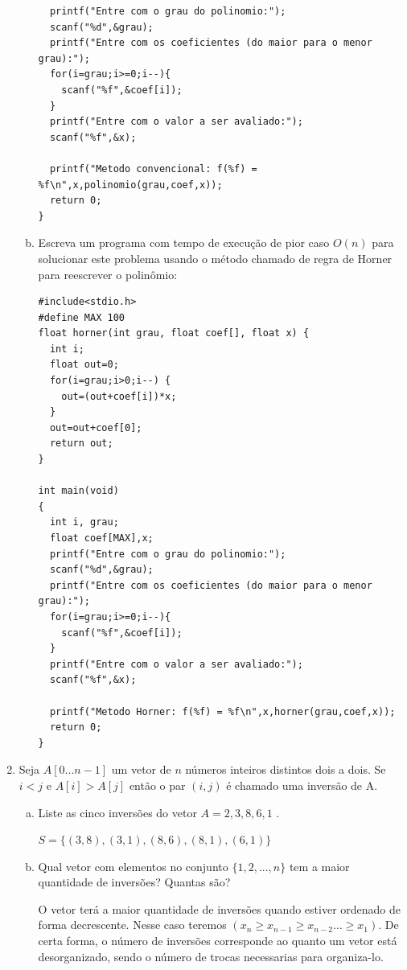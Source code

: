 \documentclass[a4paper,10pt]{article}
\begin{document}
\begin{enumerate}
\begin{enumerate}[(a)]
\begin{lstlisting}
  printf("Entre com o grau do polinomio:");
  scanf("%d",&grau);
  printf("Entre com os coeficientes (do maior para o menor grau):");
  for(i=grau;i>=0;i--){
    scanf("%f",&coef[i]);
  }
  printf("Entre com o valor a ser avaliado:");
  scanf("%f",&x);

  printf("Metodo convencional: f(%f) = %f\n",x,polinomio(grau,coef,x));
  return 0;
}
\end{lstlisting}
\pagebreak

\item Escreva um programa com tempo de execução de pior caso $O(n)$ para solucionar este problema 
usando o método chamado de regra de Horner para reescrever o polinômio:

\begin{lstlisting}
#include<stdio.h>
#define MAX 100
float horner(int grau, float coef[], float x) {
  int i;
  float out=0;
  for(i=grau;i>0;i--) {
    out=(out+coef[i])*x;
  }
  out=out+coef[0];
  return out;
}

int main(void)
{
  int i, grau;
  float coef[MAX],x;
  printf("Entre com o grau do polinomio:");
  scanf("%d",&grau);
  printf("Entre com os coeficientes (do maior para o menor grau):");
  for(i=grau;i>=0;i--){
    scanf("%f",&coef[i]);
  }
  printf("Entre com o valor a ser avaliado:");
  scanf("%f",&x);

  printf("Metodo Horner: f(%f) = %f\n",x,horner(grau,coef,x));
  return 0;
}
\end{lstlisting}
  \end{enumerate}
\pagebreak


\item Seja $A[0...n-1]$ um vetor de $n$ números inteiros distintos dois a dois. Se $i<j$ e $A[i]>A[j]$
então o par $(i,j)$ é chamado uma inversão de A.

  \begin{enumerate}[(a)]
\item Liste as cinco inversões do vetor $A = 2, 3, 8, 6, 1$ .

$S=\{ (3,8) , (3,1) , (8,6) , (8,1) , (6,1) \}$

\item Qual vetor com elementos no conjunto $\{1, 2, . . . , n\}$ tem a maior quantidade de inversões? Quantas são?

O vetor terá a maior quantidade de inversões quando estiver ordenado de forma decrescente. Nesse caso teremos 
$(x_n \geq x_{n-1} \geq x_{n-2} \ldots \geq x_{1})$. De certa forma, o número de inversões corresponde ao quanto 
um vetor está desorganizado, sendo o número de trocas necessarias para organiza-lo.


\end{enumerate}
\end{enumerate}
\end{document}
